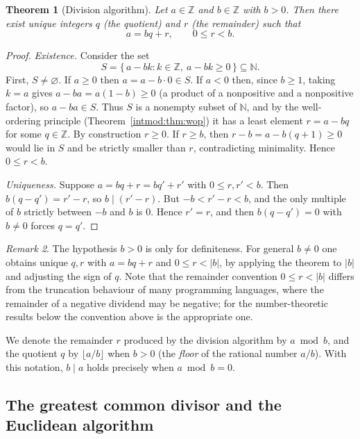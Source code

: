 \documentclass[11pt,a4paper]{article}
\newtheorem{theorem}{Theorem}[section]
\theoremstyle{definition}
\theoremstyle{remark}
\newtheorem{remark}[theorem]{Remark}
\newcommand{\N}{\ensuremath{\mathbb{N}}}
\newcommand{\Z}{\ensuremath{\mathbb{Z}}}
\begin{document}
\begin{theorem}[Division algorithm]\label{intmod:thm:division}
Let \(a\in\Z\) and \(b\in\Z\) with \(b>0\). Then there exist unique integers \(q\) (the \emph{quotient}) and \(r\) (the \emph{remainder}) such that
\[
a = bq + r, \qquad 0 \le r < b.
\]
\end{theorem}

\begin{proof}
\emph{Existence.} Consider the set
\[
S = \{\, a - bk : k\in\Z,\ a-bk \ge 0 \,\} \subseteq \N.
\]
First, \(S\neq\varnothing\). If \(a\ge 0\) then \(a=a-b\cdot 0\in S\). If \(a<0\) then, since \(b\ge 1\), taking \(k=a\) gives \(a-ba=a(1-b)\ge 0\) (a product of a nonpositive and a nonpositive factor), so \(a-ba\in S\). Thus \(S\) is a nonempty subset of \(\N\), and by the well-ordering principle (Theorem~\ref{intmod:thm:wop}) it has a least element \(r=a-bq\) for some \(q\in\Z\). By construction \(r\ge 0\). If \(r\ge b\), then \(r-b = a-b(q+1)\ge 0\) would lie in \(S\) and be strictly smaller than \(r\), contradicting minimality. Hence \(0\le r<b\).

\emph{Uniqueness.} Suppose \(a=bq+r=bq'+r'\) with \(0\le r,r'<b\). Then \(b(q-q')=r'-r\), so \(b\mid (r'-r)\). But \(-b < r'-r < b\), and the only multiple of \(b\) strictly between \(-b\) and \(b\) is \(0\). Hence \(r'=r\), and then \(b(q-q')=0\) with \(b\neq 0\) forces \(q=q'\).
\end{proof}

\begin{remark}\label{intmod:rem:negdivisor}
The hypothesis \(b>0\) is only for definiteness. For general \(b\neq 0\) one obtains unique \(q,r\) with \(a=bq+r\) and \(0\le r<|b|\), by applying the theorem to \(|b|\) and adjusting the sign of \(q\). Note that the remainder convention \(0\le r<|b|\) differs from the truncation behaviour of many programming languages, where the remainder of a negative dividend may be negative; for the number-theoretic results below the convention above is the appropriate one.
\end{remark}

We denote the remainder \(r\) produced by the division algorithm by \(a \bmod b\), and the quotient \(q\) by \(\lfloor a/b\rfloor\) when \(b>0\) (the \emph{floor} of the rational number \(a/b\)). With this notation, \(b\mid a\) holds precisely when \(a\bmod b=0\).

\subsection{The greatest common divisor and the Euclidean algorithm}\label{intmod:sub:gcd}
\end{document}
